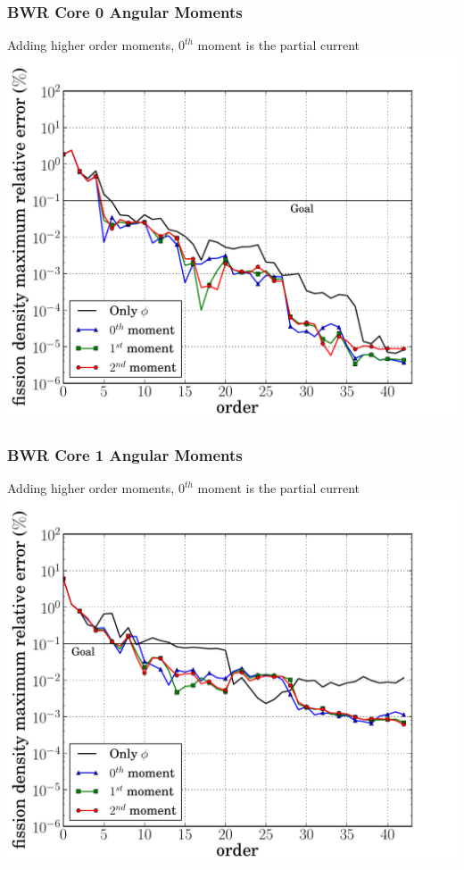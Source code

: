 \documentclass[fleqn]{beamer}
\begin{document}
  \begin{frame}
    \frametitle{BWR Core 0 Angular Moments}
    \begin{center}
    Adding higher order moments, $0^{th}$ moment is the partial current
    \includegraphics[trim=.1cm .25cm 2.0cm .4cm, clip=true, totalheight=.8\textheight]{BWR0_44_angular_comparison_fission_core-44}
    \end{center}
  \end{frame}

  \begin{frame}
    \frametitle{BWR Core 1 Angular Moments}
    \begin{center}
    Adding higher order moments, $0^{th}$ moment is the partial current
    \includegraphics[trim=.1cm .25cm 2.0cm .4cm, clip=true, totalheight=.8\textheight]{BWR1_238_angular_comparison_fission_core-44}
    \end{center}
  \end{frame}
\end{document}
